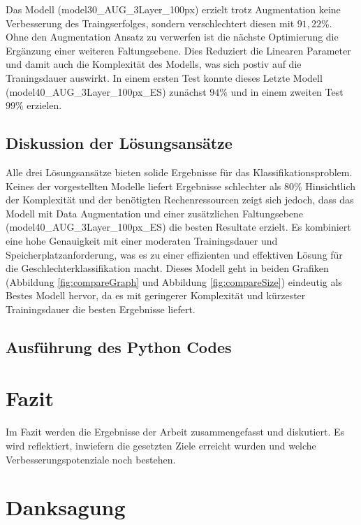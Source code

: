 \documentclass[journal,twoside,web]{ieeecolor}
\begin{document}
Das Modell (model30\_AUG\_3Layer\_100px) erzielt trotz Augmentation keine Verbesserung des Traingserfolges, sondern verschlechtert diesen mit $91,22\%$. 
Ohne den Augmentation Ansatz zu verwerfen ist die nächste Optimierung die Ergänzung einer weiteren Faltungsebene. 
Dies Reduziert die Linearen Parameter und damit auch die Komplexität des Modells, was sich postiv auf die Traningsdauer auswirkt. 
In einem ersten Test konnte dieses Letzte Modell (model40\_AUG\_3Layer\_100px\_ES) zunächst $94\%$ und in einem zweiten Test $99\%$ erzielen.

\subsection{Diskussion der Lösungsansätze}
Alle drei Lösungsansätze bieten solide Ergebnisse für das Klassifikationsproblem. Keines der vorgestellten Modelle liefert Ergebnisse schlechter als $80\%$ Hinsichtlich der Komplexität und der benötigten Rechenressourcen zeigt sich jedoch, dass das Modell mit Data Augmentation und einer zusätzlichen Faltungsebene (model40\_AUG\_3Layer\_100px\_ES) die besten Resultate erzielt. Es kombiniert eine hohe Genauigkeit mit einer moderaten Trainingsdauer und Speicherplatzanforderung, was es zu einer effizienten und effektiven Lösung für die Geschlechterklassifikation macht.
Dieses Modell geht in beiden Grafiken (Abbildung \ref{fig:compareGraph} und Abbildung \ref{fig:compareSize}) eindeutig als Bestes Modell hervor, da es mit geringerer Komplexität und kürzester Trainingsdauer die besten Ergebnisse liefert.


\subsection{Ausführung des Python Codes}


\section{Fazit}
Im Fazit werden die Ergebnisse der Arbeit zusammengefasst und diskutiert. Es wird reflektiert, inwiefern die gesetzten Ziele erreicht wurden und welche Verbesserungspotenziale noch bestehen.








\appendices


\section*{Danksagung}
\end{document}
